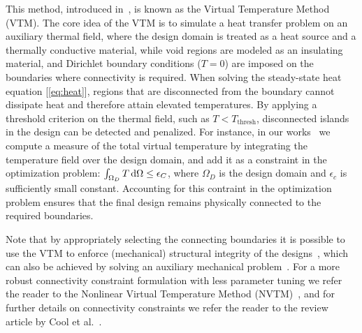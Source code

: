 This method, introduced in~\cite{li_structural_2016}, is known as the Virtual Temperature
Method (VTM). The core idea of the VTM is to simulate a heat transfer problem on an auxiliary thermal field, where the design 
domain is treated as a heat source and a thermally conductive material, while void regions are modeled as an
insulating material, and Dirichlet boundary conditions ($T = 0$) are imposed on the boundaries where connectivity is required. When 
solving the steady-state heat equation [\eqref{eq:heat}], regions that are disconnected from the boundary 
cannot dissipate heat and therefore attain elevated temperatures. By applying a threshold criterion on the thermal field, such as $T < T_\text{thresh}$, disconnected islands in the design can be 
detected and penalized. For instance, in our works~\cite{ownpub1,ownpub2} we compute a measure of the total virtual temperature
by integrating the temperature field over the design domain, and add it as a constraint in the optimization problem:
$\int_{\Omega_D} T \mathop{}\!\text{d} \Omega \leq \epsilon_C$, where $\Omega_D$ is the design domain and $\epsilon_c$ is sufficiently small constant. Accounting for this contraint in the optimization problem ensures that the final design remains physically connected to the required 
boundaries. 


Note that by appropriately selecting the connecting boundaries it is possible to use the VTM to enforce
(mechanical) structural integrity of the designs~\cite{structural_heat}, which can also be achieved by solving an auxiliary
mechanical problem~\cite{structural_integrity}. For a more robust connectivity constraint formulation with less parameter tuning we refer the reader to the Nonlinear 
Virtual Temperature Method (NVTM)~\cite{nvtm}, and for further details on connectivity constraints we refer the reader to the review 
article by Cool et al.~\cite{vanessa}.
